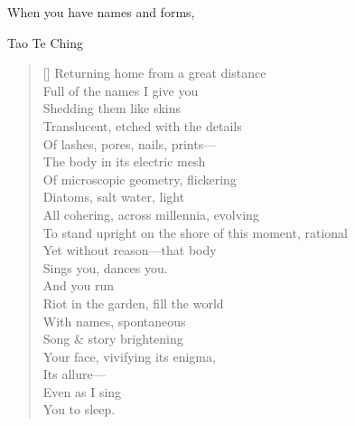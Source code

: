 When you have names and forms,

Tao Te Ching

\settowidth{\versewidth}{To stand upright on the shore of this moment, rational}
\begin{verse}[\versewidth]
Returning home from a great distance\\
Full of the names I give you\\
Shedding them like skins\\
Translucent, etched with the details\\
Of lashes, pores, nails, prints---\\
The body in its electric mesh\\
Of microscopic geometry, flickering\\
Diatoms, salt water, light\\
All cohering, across millennia, evolving\\
To stand upright on the shore of this moment, rational\\
Yet without reason---that body\\
Sings you, dances you.\\
\hfill And you run\\
Riot in the garden, fill the world\\
With names, spontaneous\\
Song \& story brightening \\
Your face, vivifying its enigma,\\
Its allure---\\
\hfill Even as I sing\\
You to sleep.
\end{verse}
